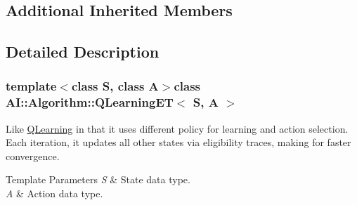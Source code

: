 \subsection*{Additional Inherited Members}


\subsection{Detailed Description}
\subsubsection*{template$<$class S, class A$>$class A\-I\-::\-Algorithm\-::\-Q\-Learning\-E\-T$<$ S, A $>$}

Like \hyperlink{classAI_1_1Algorithm_1_1QLearning}{Q\-Learning} in that it uses different policy for learning and action selection. Each iteration, it updates all other states via eligibility traces, making for faster convergence. 


\begin{DoxyTemplParams}{Template Parameters}
{\em S} & State data type. \\
\hline
{\em A} & Action data type. \\
\hline
\end{DoxyTemplParams}


